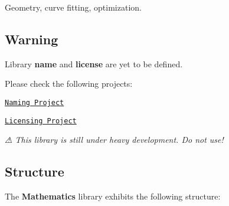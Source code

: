 Geometry, curve fitting, optimization.

\href{https://travis-ci.com/open-space-collective/library-mathematics}{\tt } \href{https://codecov.io/gh/open-space-collective/library-mathematics}{\tt } \href{https://open-space-collective.github.io/library-mathematics}{\tt } \href{https://badge.fury.io/gh/open-space-collective%2Flibrary-mathematics}{\tt } \href{https://badge.fury.io/py/LibraryMathematicsPy}{\tt }

\subsection*{Warning}

Library {\bfseries name} and {\bfseries license} are yet to be defined.

Please check the following projects\+:


\begin{DoxyItemize}
\item \href{https://github.com/orgs/open-space-collective/projects/1}{\tt Naming Project}
\item \href{https://github.com/orgs/open-space-collective/projects/2}{\tt Licensing Project}
\end{DoxyItemize}

{\itshape ⚠ This library is still under heavy development. Do not use!}

\subsection*{Structure}

The {\bfseries Mathematics} library exhibits the following structure\+:


